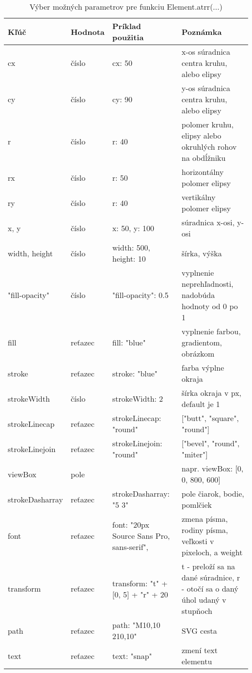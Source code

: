 \begin{table}[tp]
	\begin{center}
	
	\begin{tabular}{|l|l|p{4cm}|p{6cm}|}
	\hline \textbf{	Kľúč} & \textbf{Hodnota} & \textbf{Príklad použitia} & \textbf{Poznámka} \\ 
		\hline cx & číslo & cx: 50 & x-os súradnica centra kruhu, alebo elipsy \\ 
		\hline cy & číslo & cy: 90 & y-os súradnica centra kruhu, alebo elipsy \\ 
		\hline r & číslo & r: 40 & polomer kruhu, elipsy alebo okruhlých rohov na obdĺžniku \\ 
		\hline rx & číslo & r: 50 & horizontálny polomer elipsy \\ 
		\hline ry & číslo & r: 40 & vertikálny polomer elipsy \\ 
		\hline x, y & číslo & x: 50, y: 100 & súradnica x-osi, y-osi  \\ 
			\hline width, height & číslo & width: 500, height: 10 & šírka, výška \\ 
			\hline "fill-opacity" & číslo & "fill-opacity": 0.5 & vyplnenie neprehľadnosti, nadobúda hodnoty od 0 po 1 \\ 
		\hline fill & reťazec & fill: "blue" & vyplnenie farbou, gradientom, obrázkom \\ 
		\hline stroke & reťazec & stroke: "blue" & farba výplne okraja \\ 
		\hline strokeWidth & číslo & strokeWidth: 2 & šírka okraja v px, default je 1 \\ 
		\hline strokeLinecap & reťazec & strokeLinecap: "round" & ["butt", "square", "round"] \\ 
		\hline strokeLinejoin & reťazec &  strokeLinejoin: "round" & ["bevel", "round", "miter"] \\ 
		\hline viewBox & pole & & napr. viewBox: [0, 0, 800, 600]
		  \\ 
		\hline strokeDasharray & reťazec &    strokeDasharray: "5 3" & pole čiarok, bodie, pomlčiek \\ 
		\hline font & reťazec &   font: "20px Source Sans Pro, sans-serif", & zmena písma, rodiny písma, veľkosti v pixeloch, a weight \\ 
		\hline transform & reťazec & transform: "t" + [0, 5] +
		"r" + 20 & t - preloží sa na dané súradnice, r - otočí sa o daný úhol udaný v stupňoch \\ 
			\hline path & reťazec & path: "M10,10 210,10" & SVG cesta \\ 
			\hline text & reťazec & text: "snap" & zmení text elementu \\ 
		\hline 
	\end{tabular} 
	
		\end{center}
		\caption{Výber možných parametrov pre funkciu Element.atrr(...)}
		\label{parametre:attr}
\end{table}



